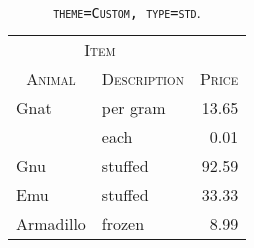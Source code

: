 \begin{table}[!htb]
\large
\centering
\begin{tabular}{|l||l|r|}
\hline
\multicolumn{2}{|c|}{\textsc{Item}}    & \multicolumn{1}{c|}{\textsc{}}            \\
\multicolumn{1}{|c||}{\textsc{Animal}} & \multicolumn{1}{c|}{\textsc{Description}} & \multicolumn{1}{c|}{\textsc{Price}} \\
\hline
\hline
Gnat      & per gram & 13.65 \\
          & each     & 0.01  \\
Gnu       & stuffed  & 92.59 \\
Emu       & stuffed  & 33.33 \\
Armadillo & frozen   & 8.99  \\
\hline
\end{tabular}
\caption[\texttt{theme=Custom, type=std}]{\textsc{\texttt{theme=Custom, type=std}. }}
\end{table}
